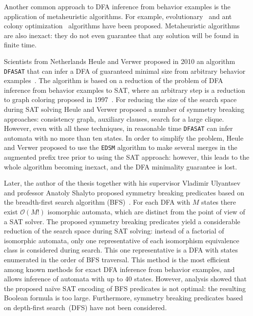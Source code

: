 Another common approach to DFA inference from behavior examples is the application of metaheuristic algorithms.
For example, evolutionary~\cite{DBLP:journals/pami/LucasR05,DBLP:conf/cec/Gomez06} and ant colony optimization~\cite{chivilikhin-12-ant} algorithms have been proposed.
Metaheuristic algorithms are also inexact: they do not even guarantee that any solution will be found in finite time.

Scientists from Netherlands Heule and Verwer proposed in 2010 an algorithm \texttt{DFASAT} that can infer a DFA of guaranteed minimal size from arbitrary behavior examples~\cite{heule-icgi10}.
The algorithm is based on a reduction of the problem of DFA inference from behavior examples to SAT, where an arbitrary step is a reduction to graph coloring proposed in 1997~\cite{Coste97regularinference}.
For reducing the size of the search space during SAT solving Heule and Verwer proposed a number of symmetry breaking approaches: consistency graph, auxiliary clauses, search for a large clique.
However, even with all these techniques, in reasonable time \texttt{DFASAT} can infer automata with no more than ten states.
In order to simplify the problem, Heule and Verwer proposed to use the \texttt{EDSM} algorithm to make several merges in the augmented prefix tree prior to using the SAT approach: however, this leads to the whole algorithm becoming inexact, and the DFA minimality guarantee is lost.

Later, the author of the thesis together with his supervisor Vladimir Ulyantsev and professor Anatoly Shalyto proposed symmetry breaking predicates based on the breadth-first search algorithm
(BFS)~\cite{zakirzyanov2015LATA}.
For each DFA with $M$ states there exist $\mathcal{O}\left(M!\right)$ isomorphic automata, which are distinct from the point of view of a SAT solver.
The proposed symmetry breaking predicates yield a considerable reduction of the search space during SAT solving: instead of a factorial of isomorphic automata, only one representative of each
isomorphism equivalence class is considered during search.
This one representative is a DFA with states enumerated in the order of BFS traversal.
This method is the most efficient among known methods for exact DFA inference from behavior examples, and allows inference of automata with up to 40 states.
However, analysis showed that the proposed na\"ive SAT encoding of BFS predicates is not optimal: the resulting Boolean formula is too large.
Furthermore, symmetry breaking predicates based on depth-first search~(DFS) have not been considered.

